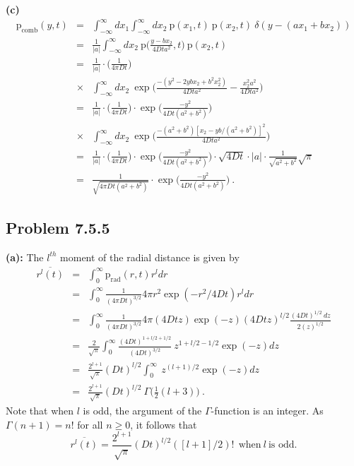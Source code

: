 \textbf{(c)} 
\begin{eqnarray}
\text{p}_\text{comb}(y, t) &=& \int_{-\infty}^{\infty} dx_1  \int_{-\infty}^{\infty} dx_2 ~ \text{p}(x_1, t)~\text{p}(x_2, t)~\delta(y - (a x_1 + b x_2)) \nonumber \\
&=& \frac{1}{|a|}\int_{-\infty}^{\infty} dx_2 ~ \text{p}\bigg(\frac{y-b x_2}{4 D t a^2}, t\bigg)~\text{p}(x_2, t) \nonumber \\
&=&  \frac{1}{|a|} \cdot \bigg(\frac{1}{4 \pi D t}\bigg) \nonumber \\
&\times& \int_{-\infty}^{\infty} dx_2 ~ \exp\bigg( \frac{-(y^2 - 2 y b x_2 + b^2 x_2^2)}{4 D t a^2} - \frac{x_2^2 a^2}{4 D t a^2}
\bigg) \nonumber \\
&=& \frac{1}{|a|} \cdot \bigg(\frac{1}{4 \pi D t}\bigg) \cdot \exp\bigg( \frac{-y^2}{4 D t (a^2 + b^2)}\bigg) \nonumber \\
&\times& \int_{-\infty}^{\infty} dx_2 ~ \exp\bigg( \frac{-(a^2 + b^2) [x_2 - y b /(a^2 +b^2)]^2}{4 D t a^2} \bigg) \nonumber \\
&=& \frac{1}{|a|} \cdot \bigg(\frac{1}{4 \pi D t}\bigg)  \cdot \exp\bigg( \frac{-y^2}{4 D t (a^2 + b^2)}\bigg) \cdot \sqrt{4 D t} \cdot |a| \cdot \frac{1}{\sqrt{a^2 + b^2}} \sqrt{\pi} \nonumber \\
&=& \boxed{\frac{1}{\sqrt{4 \pi D t (a^2 + b^2)}} \cdot \exp\bigg( \frac{-y^2}{4 D t (a^2 + b^2)}\bigg)}~.
\end{eqnarray}

\subsection{Problem 7.5.5}
\textbf{(a):} The $l^{th}$ moment of the radial distance is given by
\begin{eqnarray}
\overline{r^l(t)} &=& \int_{0}^{\infty} \text{p}_\text{rad}(r, t) r^l dr \nonumber \\
&=&  \int_{0}^{\infty} \frac{1}{(4 \pi D t)^{3/2}} 4 \pi r^2 \exp(-r^2/4Dt) r^l dr \nonumber \\
&=&  \int_{0}^{\infty} \frac{1}{(4 \pi D t)^{3/2}} 4 \pi (4 D t z) \exp(-z) (4 D t z)^{l/2} \frac{(4 D t)^{1/2} ~dz}{2 (z)^{1/2}} \nonumber \\
&=&  \frac{2}{\sqrt{\pi}} \int_{0}^{\infty} \frac{(4 D t)^{1+l/2+1/2}}{(4 D t)^{3/2}}~ z^{1+l/2-1/2} \exp(-z) dz \nonumber \\
&=& \frac{2^{l+1}}{\sqrt{\pi}} (D t)^{l/2} \int_{0}^{\infty}~ z^{(l+1)/2} \exp(-z) dz \nonumber \\
&=& \boxed{\frac{2^{l+1}}{\sqrt{\pi}} (D t)^{l/2}~\Gamma\bigg(\frac{1}{2}(l+3)\bigg)}~.
\end{eqnarray}
Note that when $l$ is odd, the argument of the $\Gamma$-function is an integer. As $\Gamma(n+1) = n!$ for all $n \geq 0 $, it follows that 
\begin{equation}
\boxed{ \overline{r^l(t)} = \frac{2^{l+1}}{\sqrt{\pi}} (D t)^{l/2} ([l+1]/2)!~~\text{when}~l~\text{is odd.}} \label{eq:odd_radial_moments}
\end{equation}

